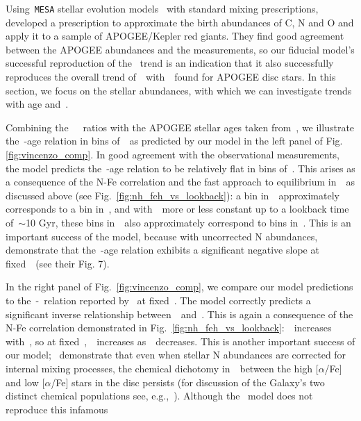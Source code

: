 \documentclass[ms.tex]{subfiles}
\begin{document}
\par
Using~\texttt{MESA} stellar evolution models~\citep{Paxton2011, Paxton2013,
Paxton2015, Paxton2018} with standard mixing prescriptions,~\citet{Vincenzo2021}
developed a prescription to approximate the birth abundances of C, N and O
and apply it to a sample of APOGEE/Kepler red giants.
They find good agreement between the APOGEE abundances and the
\citet{Dopita2016} measurements, so our fiducial model's successful reproduction
of the~\citet{Dopita2016} trend is an indication that it also successfully
reproduces the overall trend of~\no~with~\oh~found for APOGEE disc stars.
In this section, we focus on the stellar abundances, with which we can
investigate trends with age and~\ofe.
\par
Combining the~\citet{Vincenzo2021}~\no~ratios with the APOGEE stellar ages
taken from~\citet{Miglio2021}, we illustrate the~\no-age relation in bins
of~\feh~as predicted by our model in the left panel of Fig.
\ref{fig:vincenzo_comp}.
In good agreement with the observational measurements, the model predicts
the~\no-age relation to be relatively flat in bins of~\feh.
This arises as a consequence of the N-Fe correlation and the fast approach to
equilibrium in~\oh~as discussed above (see Fig.~\ref{fig:nh_feh_vs_lookback}):
a bin in~\feh~approximately corresponds to a bin in~\nh, and with~\oh~more or
less constant up to a lookback time of~$\sim$10 Gyr, these bins in~\feh~also
approximately correspond to bins in~\no.
This is an important success of the model, because with uncorrected N
abundances,~\citet{Vincenzo2021} demonstrate that the~\no-age relation exhibits
a significant negative slope at fixed~\feh~(see their Fig. 7).
\par
In the right panel of Fig.~\ref{fig:vincenzo_comp}, we compare our model
predictions to the~\no-\ofe~relation reported by~\citet{Vincenzo2021} at
fixed~\oh.
The model correctly predicts a significant inverse relationship
between~\no~and~\ofe.
This is again a consequence of the N-Fe correlation demonstrated in
Fig.~\ref{fig:nh_feh_vs_lookback}:~\nh~increases with~\feh, so at
fixed~\oh,~\no~increases as~\ofe~decreases.
This is another important success of our model;~\citet{Vincenzo2021}
demonstrate that even when stellar N abundances are corrected for internal
mixing processes, the chemical dichotomy in~\no~between the high [$\alpha$/Fe]
and low [$\alpha$/Fe] stars in the disc persists (for discussion of the
Galaxy's two distinct chemical populations see, e.g.,~\citealp{Hayden2015,
Weinberg2019, Weinberg2021, Griffith2021b}).
Although the~\citet{Johnson2021} model does not reproduce this infamous
\end{document}
